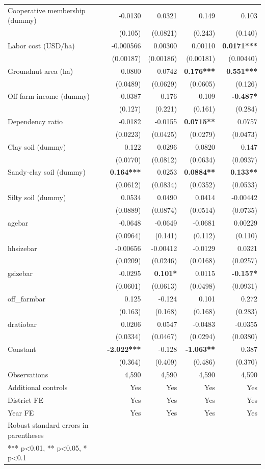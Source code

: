 \documentclass[
]{article}
\begin{document}
\begin{longtable}[t]{lrrrr}
Cooperative membership (dummy) & -0.0130 & 0.0321 & 0.149 & 0.103\\
 & (0.105) & (0.0821) & (0.243) & (0.140)\\
Labor cost (USD/ha) & -0.000566 & 0.00300 & 0.00110 & \textbf{0.0171***}\\
 & (0.00187) & (0.00186) & (0.00181) & (0.00440)\\
Groundnut area (ha) & 0.0800 & 0.0742 & \textbf{0.176***} & \textbf{0.551***}\\
 & (0.0489) & (0.0629) & (0.0605) & (0.126)\\
Off-farm income (dummy) & -0.0387 & 0.176 & -0.109 & \textbf{-0.487*}\\
 & (0.127) & (0.221) & (0.161) & (0.284)\\
Dependency ratio & -0.0182 & -0.0155 & \textbf{0.0715**} & 0.0757\\
 & (0.0223) & (0.0425) & (0.0279) & (0.0473)\\
Clay soil (dummy) & 0.122 & 0.0296 & 0.0820 & 0.147\\
 & (0.0770) & (0.0812) & (0.0634) & (0.0937)\\
Sandy-clay soil (dummy) & \textbf{0.164***} & 0.0253 & \textbf{0.0884**} & \textbf{0.133**}\\
 & (0.0612) & (0.0834) & (0.0352) & (0.0533)\\
Silty soil (dummy) & 0.0534 & 0.0490 & 0.0414 & -0.00442\\
 & (0.0889) & (0.0874) & (0.0514) & (0.0735)\\
agebar & -0.0648 & -0.0649 & -0.0681 & 0.00229\\
 & (0.0964) & (0.141) & (0.112) & (0.110)\\
hhsizebar & -0.00656 & -0.00412 & -0.0129 & 0.0321\\
 & (0.0209) & (0.0246) & (0.0168) & (0.0257)\\
gsizebar & -0.0295 & \textbf{0.101*} & 0.0115 & \textbf{-0.157*}\\
 & (0.0601) & (0.0613) & (0.0498) & (0.0931)\\
off\_farmbar & 0.125 & -0.124 & 0.101 & 0.272\\
 & (0.163) & (0.168) & (0.168) & (0.283)\\
dratiobar & 0.0206 & 0.0547 & -0.0483 & -0.0355\\
 & (0.0334) & (0.0467) & (0.0294) & (0.0380)\\
Constant & \textbf{-2.022***} & -0.128 & \textbf{-1.063**} & 0.387\\
\midrule
 & (0.364) & (0.409) & (0.486) & (0.370)\\
Observations & 4,590 & 4,590 & 4,590 & 4,590\\
Additional controls & Yes & Yes & Yes & Yes\\
District FE & Yes & Yes & Yes & Yes\\
Year FE & Yes & Yes & Yes & Yes\\
\midrule
Robust standard errors in parentheses &  &  &  & \\
*** p<0.01, ** p<0.05, * p<0.1 &  &  &  & \\*
\end{longtable}
\endgroup{}
\end{document}
